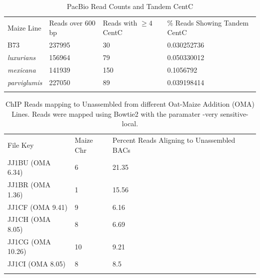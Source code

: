 \begin{table}[h!]
\caption{PacBio Read Counts and Tandem CentC}
\label{supp.pacbio}       %
\begin{tabular}{llll}
\hline\noalign{\smallskip}
Maize Line & Reads over 600 bp & Reads with $\geq 4$ CentC & \% Reads Showing Tandem CentC \\
\noalign{\smallskip}\hline\noalign{\smallskip}				
B73	& 237995	& 30	& 0.030252736	\\
\emph{luxurians}		&156964	&	79	&	0.050330012	\\
\emph{mexicana}	 	&141939 	&	150	&	0.1056792	\\
\emph{parviglumis}	&227050	& 89		&	0.039198414	\\
\noalign{\smallskip}\hline
\end{tabular}
\end{table}

\begin{table}[h!]
\caption{ChIP Reads mapping to Unassembled from different Oat-Maize Addition (OMA) Lines.  Reads were mapped using Bowtie2 \citep{langmead2012fast} with the paramater -very sensitive-local.}\label{supp.gaby}       %

\begin{tabular}{llll}
\hline\noalign{\smallskip}
File Key & Maize Chr & Percent Reads Aligning to Unassembled BACs\\
\noalign{\smallskip}\hline\noalign{\smallskip}				
JJ1BU (OMA 6.34) & 6 & 21.35\\
JJ1BR (OMA 1.36) & 1 & 15.56\\
JJ1CF (OMA 9.41) & 9 & 6.16\\
JJ1CH (OMA 8.05) & 8 & 6.69\\
JJ1CG (OMA 10.26) & 10 & 9.21\\
JJ1CI (OMA 8.05) & 8 & 8.5\\
\noalign{\smallskip}\hline
\end{tabular}
\end{table}

